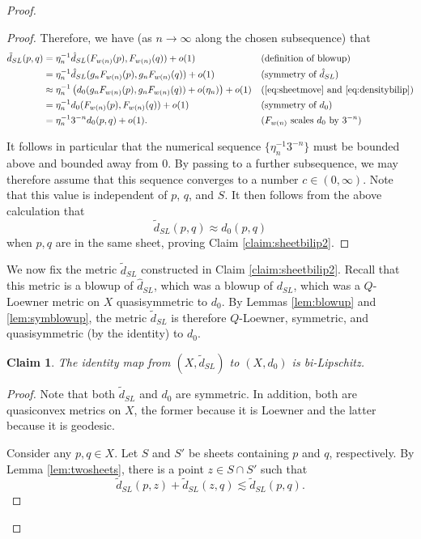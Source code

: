 \documentclass{amsart}
\theoremstyle{plain}
\newtheorem{claim}[theorem]{Claim}
\theoremstyle{definition}
\numberwithin{equation}{section}
\numberwithin{theorem}{section}
\begin{document}
\begin{proof}
\begin{proof}
Therefore, we have (as $n\rightarrow\infty$ along the chosen subsequence) that
\begin{align*}
\tilde{d}_{SL}(p, q) &=  \eta_n^{-1} \hat{d}_{SL}(F_{w(n)}(p), F_{w(n)}(q)) + o(1) && \text{(definition of blowup)}\\
&= \eta_n^{-1} \hat{d}_{SL}(g_nF_{w(n)}(p), g_nF_{w(n)}(q)) + o(1) && \text{(symmetry of } \hat{d}_{SL}\text{)}\\
&\approx \eta_n^{-1} \left( d_0(g_nF_{w(n)}(p), g_nF_{w(n)}(q)) + o(\eta_n) \right) + o(1) && \text{(\eqref{eq:sheetmove} and \eqref{eq:densitybilip})}\\
&= \eta_n^{-1} d_0(F_{w(n)}(p), F_{w(n)}(q)) + o(1) && \text{(symmetry of } {d}_{0}\text{)}\\
&=\eta_n^{-1} 3^{-n} d_0(p, q) + o(1). && \text{(}F_{w(n)}\text{ scales } d_0 \text{ by } 3^{-n}\text{)}\\
\end{align*}

It follows in particular that the numerical sequence $\{\eta_n^{-1} 3^{-n}\}$ must be bounded above and bounded away from $0$. By passing to a further subsequence, we may therefore assume that this sequence converges to a number $c\in (0,\infty)$. Note that this value is independent of $p$, $q$, and $S$. It then follows from the above calculation that
$$ \tilde{d}_{SL}(p,q) \approx d_0(p,q)$$
when $p,q$ are in the same sheet, proving Claim \ref{claim:sheetbilip2}.
\end{proof}

We now fix the metric $\tilde{d}_{SL}$ constructed in Claim \ref{claim:sheetbilip2}. Recall that this metric is a blowup of $\hat{d}_{SL}$, which was a blowup of $d_{SL}$, which was a $Q$-Loewner metric on $X$ quasisymmetric to $d_0$. By Lemmas \ref{lem:blowup} and \ref{lem:symblowup}, the metric $\tilde{d}_{SL}$ is therefore $Q$-Loewner,  symmetric, and quasisymmetric (by the identity) to $d_0$.

\begin{claim}\label{claim:pillowbilip}
The identity map from $(X,\tilde{d}_{SL})$ to $(X,d_0)$ is bi-Lipschitz.
\end{claim}
\begin{proof}
   
Note that both $\tilde{d}_{SL}$ and $d_0$ are symmetric. In addition, both are quasiconvex metrics on $X$, the former because it is Loewner and the latter because it is geodesic.

Consider any $p,q\in X$. Let $S$ and $S'$ be sheets containing $p$ and $q$, respectively. By Lemma \ref{lem:twosheets}, there is a point $z\in S\cap S'$ such that
$$ \tilde{d}_{SL}(p,z) + \tilde{d}_{SL}(z,q) \lesssim \tilde{d}_{SL}(p,q).$$


\end{proof}
\end{proof}
\end{document}
